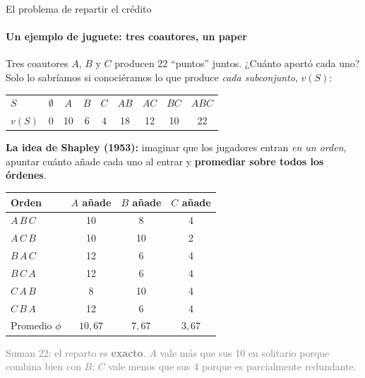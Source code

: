 \documentclass{beamer}
\newcommand{\1}{\mathbb{I}}
\begin{document}
\begin{frame}{El problema de repartir el crédito}
\framesubtitle{Un ejemplo de juguete: tres coautores, un paper}
\small
Tres coautores $A$, $B$ y $C$ producen 22 ``puntos'' juntos. ¿Cuánto aportó cada uno? Solo lo sabríamos si conociéramos lo que produce \emph{cada subconjunto}, $v(S)$:
\begin{center}
\footnotesize
\begin{tabular}{lcccccccc}
\hline
$S$ & $\emptyset$ & $A$ & $B$ & $C$ & $AB$ & $AC$ & $BC$ & $ABC$ \\
$v(S)$ & 0 & 10 & 6 & 4 & 18 & 12 & 10 & 22 \\
\hline
\end{tabular}
\end{center}
\pause
\textbf{La idea de Shapley (1953):} imaginar que los jugadores entran \emph{en un orden}, apuntar cuánto añade cada uno al entrar y \textbf{promediar sobre todos los órdenes}.
\begin{center}
\footnotesize
\begin{tabular}{lccc}
\hline
Orden & $A$ añade & $B$ añade & $C$ añade \\
\hline
$A\,B\,C$ & 10 & 8 & 4 \\
$A\,C\,B$ & 10 & 10 & 2 \\
$B\,A\,C$ & 12 & 6 & 4 \\
$B\,C\,A$ & 12 & 6 & 4 \\
$C\,A\,B$ & 8 & 10 & 4 \\
$C\,B\,A$ & 12 & 6 & 4 \\
\hline
Promedio $\phi$ & $10{,}67$ & $7{,}67$ & $3{,}67$ \\
\hline
\end{tabular}
\end{center}
\pause
\textcolor{gray}{Suman 22: el reparto es \textbf{exacto}. $A$ vale más que sus 10 en solitario porque combina bien con $B$; $C$ vale menos que sus 4 porque es parcialmente redundante.}
\end{frame}
\end{document}
